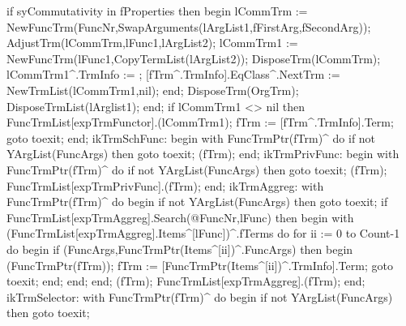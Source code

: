                   if syCommutativity in fProperties then
                  begin
                     lCommTrm := NewFuncTrm(FuncNr,SwapArguments(lArgList1,fFirstArg,fSecondArg));
                     AdjustTrm(lCommTrm,lFunc1,lArgList2);
                     lCommTrm1 := NewFuncTrm(lFunc1,CopyTermList(lArgList2));
                     DisposeTrm(lCommTrm);
                     lCommTrm1^.TrmInfo := ;
                     [fTrm^.TrmInfo].EqClass^.NextTrm := NewTrmList(lCommTrm1,nil);
                  end;
               DisposeTrm(OrgTrm);
               DisposeTrmList(lArglist1);
            end;
            if lCommTrm1 <> nil then FuncTrmList[expTrmFunctor].(lCommTrm1);
            fTrm := [fTrm^.TrmInfo].Term;
            goto toexit;
         end;
         ikTrmSchFunc:
            begin
               with FuncTrmPtr(fTrm)^ do
                  if not YArgList(FuncArgs) then goto toexit;
               (fTrm);
            end;
         ikTrmPrivFunc:
            begin
               with FuncTrmPtr(fTrm)^ do
                  if not YArgList(FuncArgs) then goto toexit;
               (fTrm);
               FuncTrmList[expTrmPrivFunc].(fTrm);
            end;
         ikTrmAggreg:
            with FuncTrmPtr(fTrm)^ do
         begin
            if not YArgList(FuncArgs) then goto toexit;
            if FuncTrmList[expTrmAggreg].Search(@FuncNr,lFunc) then
            begin
               with (FuncTrmList[expTrmAggreg].Items^[lFunc])^.fTerms do
                  for ii := 0 to Count-1 do
                  begin
                     if (FuncArgs,FuncTrmPtr(Items^[ii])^.FuncArgs) then
                     begin
                        (FuncTrmPtr(fTrm));
                        fTrm := [FuncTrmPtr(Items^[ii])^.TrmInfo].Term;
                        goto toexit;
                     end;
                  end;
            end;
            (fTrm);
            FuncTrmList[expTrmAggreg].(fTrm);
         end;
         ikTrmSelector:
            with FuncTrmPtr(fTrm)^ do
         begin
            if not YArgList(FuncArgs) then goto toexit;
